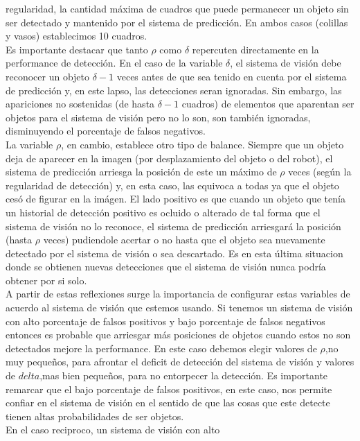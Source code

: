 regularidad, la cantidad máxima de cuadros que puede permanecer un 
objeto sin ser detectado y mantenido por el sistema de predicción. En 
ambos casos (colillas y vasos) establecimos 10 cuadros.\\ 
\indent Es importante destacar que tanto $\rho$ como $\delta$ repercuten directamente en la 
performance de detección. En el caso de la variable $\delta$, el 
sistema de visión debe reconocer un objeto $\delta -1$ veces antes de que sea 
tenido en cuenta por el sistema de predicción y, en este lapso, las 
detecciones seran ignoradas. Sin embargo, las apariciones no sostenidas 
(de hasta $\delta -1$ cuadros) de elementos que aparentan ser objetos 
para el sistema de visión pero no lo son, son también ignoradas, 
disminuyendo el porcentaje de falsos negativos.\\
\indent La variable $\rho$, en cambio, establece otro tipo de balance. 
	Siempre que un objeto deja de aparecer en la imagen (por 
	desplazamiento del objeto o del robot), el sistema de 
	predicción arriesga la posición de este un máximo de $\rho$ veces 
	(según la regularidad de detección) y, en esta caso, las equivoca a 
	todas ya que el objeto cesó de figurar en la imágen. El lado 
	positivo es que cuando un objeto que tenía un historial de 
	detección positivo es ocluido o alterado de tal forma que el 
	sistema de visión no lo reconoce, el sistema de predicción 
	arriesgará la posición (hasta $\rho$ veces) pudiendole acertar o no hasta que el objeto 
	sea nuevamente detectado por el sistema de visión o sea descartado. 
	Es en esta última situacion donde se obtienen nuevas detecciones que el sistema de visión 
	nunca podría obtener por si solo.\\
	\indent A partir de estas reflexiones surge la importancia de configurar 
	estas variables de acuerdo al sistema de visión que estemos 
	usando. Si tenemos un sistema de visión con alto porcentaje de 
	falsos positivos y bajo porcentaje de falsos negativos entonces es 
	probable que arriesgar más posiciones de objetos cuando estos no 
	son detectados mejore la performance. En este caso debemos elegir 
	valores de $\rho$,no muy pequeños, para afrontar el deficit de 
	detección del sistema de visión  y valores de $delta$,mas bien 
	pequeños, para no entorpecer la detección. Es importante remarcar 
	que el bajo porcentaje de falsos positivos, en este caso, nos 
	permite confiar en el sistema de visión en el sentido de que las cosas que 
	este detecte tienen altas probabilidades de ser objetos. \\
	\indent En el caso reciproco, un sistema de visión con alto 
